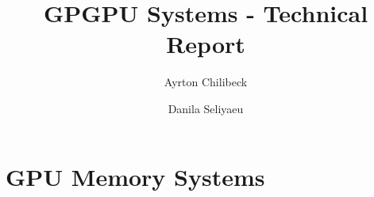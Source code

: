 



\title{GPGPU Systems - Technical Report}
\author[1]{Ayrton Chilibeck}
\author[1]{Danila Seliyaeu}



\maketitle

\vspace{2ex}

\tableofcontents

\part{GPU Memory Systems}






\printbibliography

